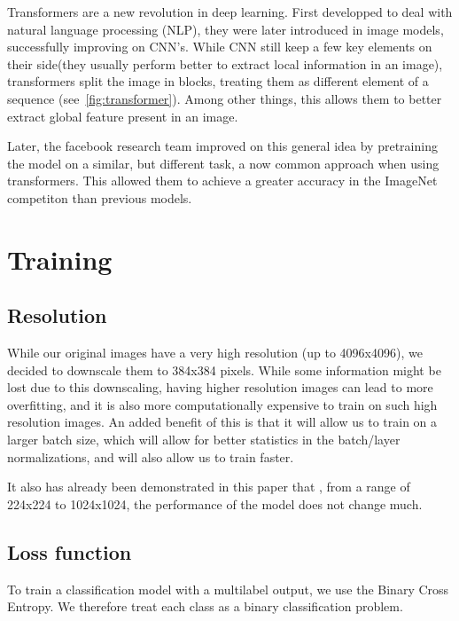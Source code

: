 \documentclass[11pt]{article}
\begin{document}
        Transformers are a new revolution in deep learning. First developped to deal with natural language processing (NLP),
        they were later introduced in image models, successfully improving on CNN's. While CNN still keep a few key
        elements on their side(they usually perform better to extract local information in an image), transformers split the image in blocks,
        treating them as different element of a sequence (see~\ref{fig:transformer}). Among other things, this allows them to better extract global feature present in an image.

        Later, the facebook research team improved on this general idea by pretraining the model on a similar, but different task, a now
        common approach when using transformers. This allowed them to achieve a greater accuracy in the ImageNet competiton than previous models.


    \section{Training}

    \subsection{Resolution}

        While our original images have a very high resolution (up to 4096x4096), we decided to downscale them to
        384x384 pixels. While some information might be lost due to this downscaling, having higher resolution images
        can lead to more overfitting, and it is also more computationally expensive to train on such high resolution
        images. An added benefit of this is that it will allow us to train on a larger batch size, which will allow
        for better statistics in the batch/layer normalizations, and will also allow us to train faster.

        It also has already been demonstrated in this paper \cite{resolution} that , from a range of 224x224 to
        1024x1024, the performance of the model does not change much.

    \subsection{Loss function}
        To train a classification model with a multilabel output, we use the Binary Cross Entropy. We therefore treat
        each class as a binary classification problem.
\end{document}
